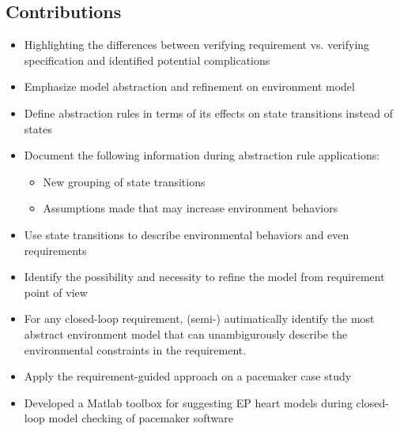 \documentclass{llncs}
\begin{document}

\subsection{Contributions}
\begin{itemize}
	\item Highlighting the differences between verifying requirement vs. verifying specification and identified potential complications
    \item Emphasize model abstraction and refinement on environment model
    
    \item Define abstraction rules in terms of its effects on state transitions instead of states
    \item Document the following information during abstraction rule applications:
    
\begin{itemize}
	\item New grouping of state transitions
    \item Assumptions made that may increase environment behaviors
\end{itemize}
    \item Use state transitions to describe environmental behaviors and even requirements
    \item Identify the possibility and necessity to refine the model from requirement point of view
    \item For any closed-loop requirement, (semi-) autimatically identify the most abstract environment model that can unambigurously describe the environmental constraints in the requirement.
    \item Apply the requirement-guided approach on a pacemaker case study
    \item Developed a Matlab toolbox for suggesting EP heart models during closed-loop model checking of pacemaker software
\end{itemize}
\end{document}
